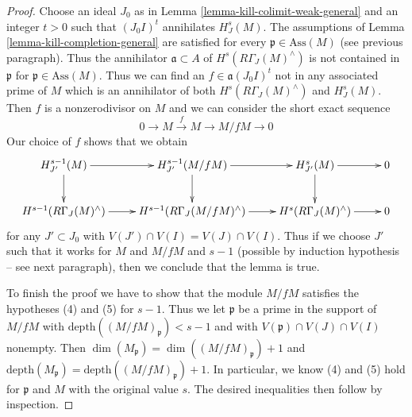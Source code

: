 \documentclass[10pt,a4paper]{amsart}
\theoremstyle{plain}
\theoremstyle{definition}
\theoremstyle{remark}
\numberwithin{equation}{subsection}
\begin{document}
\begin{proof}
\medskip\noindent
Choose an ideal $J_0$ as in Lemma \ref{lemma-kill-colimit-weak-general}
and an integer $t > 0$ such that $(J_0I)^t$ annihilates $H^s_J(M)$.
The assumptions of Lemma \ref{lemma-kill-completion-general}
are satisfied for every $\mathfrak p \in \text{Ass}(M)$
(see previous paragraph).
Thus the annihilator $\mathfrak a \subset A$ of
$H^s(R\Gamma_J(M)^\wedge)$
is not contained in $\mathfrak p$ for $\mathfrak p \in \text{Ass}(M)$.
Thus we can find an $f \in \mathfrak a(J_0I)^t$
not in any associated prime of $M$ which is an annihilator
of both $H^s(R\Gamma_J(M)^\wedge)$ and $H^s_J(M)$.
Then $f$ is a nonzerodivisor on $M$ and we can consider the
short exact sequence
$$
0 \to M \xrightarrow{f} M \to M/fM \to 0
$$
Our choice of $f$ shows that we obtain
$$
\xymatrix{
H^{s - 1}_{J'}(M) \ar[d] \ar[r] &
H^{s - 1}_{J'}(M/fM) \ar[d] \ar[r] &
H^s_{J'}(M) \ar[d] \ar[r] & 0 \\
H^{s - 1}(R\Gamma_J(M)^\wedge) \ar[r] &
H^{s - 1}(R\Gamma_J(M/fM)^\wedge) \ar[r] &
H^s(R\Gamma_J(M)^\wedge) \ar[r] & 0
}
$$
for any $J' \subset J_0$ with $V(J') \cap V(I) = V(J) \cap V(I)$.
Thus if we choose $J'$ such that it works for
$M$ and $M/fM$ and $s - 1$ (possible by induction hypothesis --
see next paragraph), then we conclude that the lemma is true.

\medskip\noindent
To finish the proof we have to show that the module
$M/fM$ satisfies the hypotheses (4) and (5) for $s - 1$.
Thus we let $\mathfrak p$ be a prime in the support
of $M/fM$ with $\text{depth}((M/fM)_\mathfrak p) < s - 1$
and with $V(\mathfrak p) \cap V(J) \cap V(I)$ nonempty.
Then $\dim(M_\mathfrak p) = \dim((M/fM)_\mathfrak p) + 1$
and $\text{depth}(M_\mathfrak p) = \text{depth}((M/fM)_\mathfrak p) + 1$.
In particular, we know (4) and (5) hold for $\mathfrak p$ and $M$
with the original value $s$.
The desired inequalities then follow by inspection.
\end{proof}



\end{document}

